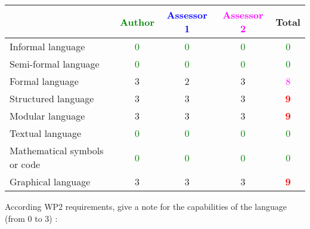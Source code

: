 \begin{tabular}{|l | c | c | c | c|}
  \hline
  & \textcolor{green}{Author} & \textcolor{blue}{Assessor 1} & \textcolor{magenta}{Assessor 2} & Total \\
  \hline 
  Informal language & \textcolor{green}{0}   & \textcolor{green}{0}   & \textcolor{green}{0} & \textcolor{green}{0}  \\
  \hline 
  Semi-formal language & \textcolor{green}{0}   & \textcolor{green}{0}   & \textcolor{green}{0} &  \textcolor{green}{0}  \\
  \hline
  Formal language &3 &2 & 3    & \textcolor{magenta}{8} \\
  \hline
  Structured language &3 &3 & 3    & \textcolor{red}{\textbf{9}} \\
  \hline
  Modular language &3 &3 & 3    & \textcolor{red}{\textbf{9}} \\
  \hline
  Textual language & \textcolor{green}{0}   & \textcolor{green}{0}   & \textcolor{green}{0} & \textcolor{green}{0} \\
  \hline
  Mathematical symbols or code & \textcolor{green}{0}   & \textcolor{green}{0}   & \textcolor{green}{0} & \textcolor{green}{0} \\
  \hline
  Graphical language &3 &3 & 3    & \textcolor{red}{\textbf{9}} \\
  \hline
\end{tabular}

According WP2 requirements, give a note for the capabilities of the language (from 0 to 3) :

